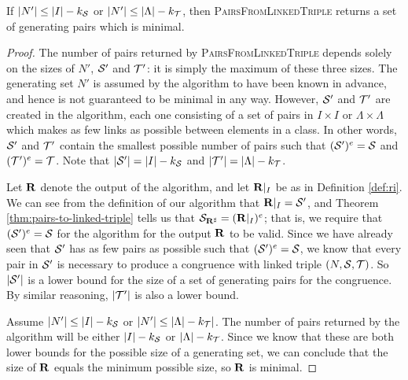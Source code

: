 \begin{theorem}
  If $|N'| \leq |I| - k_{\mathcal{S}}$ or $|N'| \leq |\Lambda| - k_{\mathcal{T}}$, then
  \textsc{PairsFromLinkedTriple} returns a set of generating pairs
  which is minimal.
  \begin{proof}
    The number of pairs returned by \textsc{PairsFromLinkedTriple}
    depends solely on the sizes of $N'$, $\mathcal{S}'$ and $\mathcal{T}'$: it is simply the
    maximum of these three sizes.  The generating set $N'$ is assumed by the
    algorithm to have been known in advance, and hence is not guaranteed to be
    minimal in any way.  However, $\mathcal{S}'$ and $\mathcal{T}'$ are created in the
    algorithm, each one consisting of a set of pairs in $I \times I$ or
    $\Lambda \times \Lambda$ which makes as few links as possible between
    elements in a class. In other words, $\mathcal{S}'$ and $\mathcal{T}'$ contain the smallest
    possible number of pairs such that $(\mathcal{S}')^e = \mathcal{S}$ and $(\mathcal{T}')^e = \mathcal{T}$.
    Note that $|\mathcal{S}'| = |I| - k_{\mathcal{S}}$ and $|\mathcal{T}'| = |\Lambda| - k_{\mathcal{T}}$.

    Let $\mathbf{R}$ denote the output of the algorithm, and let $\mathbf{R}|_I$ be as in
    Definition \ref{def:ri}.  We can see from the definition of our algorithm
    that $\mathbf{R}|_I = \mathcal{S}'$, and Theorem \ref{thm:pairs-to-linked-triple} tells us
    that $\mathcal{S}_{\mathbf{R}^\sharp} = (\mathbf{R}|_I)^e$; that is, we require that $(\mathcal{S}')^e = \mathcal{S}$ for
    the algorithm for the output $\mathbf{R}$ to be valid.  Since we have already seen
    that $\mathcal{S}'$ has as few pairs as possible such that $(\mathcal{S}')^e = \mathcal{S}$, we know
    that every pair in $\mathcal{S}'$ is necessary to produce a congruence with linked
    triple $(N, \mathcal{S}, \mathcal{T})$.  So $|\mathcal{S}'|$ is a lower bound for the
    size of a set of generating pairs for the congruence.  By similar reasoning,
    $|\mathcal{T}'|$ is also a lower bound.

    Assume $|N'| \leq |I| - k_{\mathcal{S}}$ or $|N'| \leq |\Lambda| - k_{\mathcal{T}}|$.  The
    number of pairs returned by the algorithm will be either $|I| - k_{\mathcal{S}}$ or
    $|\Lambda| - k_{\mathcal{T}}$.  Since we know that these are both lower bounds for the
    possible size of a generating set, we can conclude that the size of $\mathbf{R}$
    equals the minimum possible size, so $\mathbf{R}$ is minimal.
  \end{proof}
\end{theorem}

